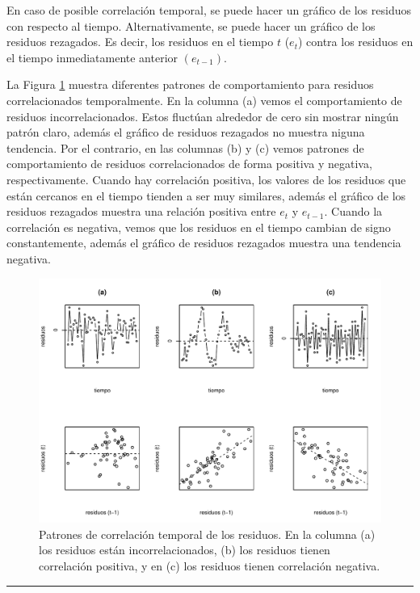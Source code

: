 \documentclass[
]{article}
\begin{document}
En caso de posible correlación temporal, se puede hacer un gráfico de los residuos con respecto al tiempo. Alternativamente, se puede hacer un gráfico de los residuos rezagados. Es decir, los residuos en el tiempo \(t\) (\(e_{t}\)) contra los residuos en el tiempo inmediatamente anterior \((e_{t-1})\).

La Figura \ref{fig:residuosCorr} muestra diferentes patrones de comportamiento para residuos correlacionados temporalmente. En la columna (a) vemos el comportamiento de residuos incorrelacionados. Estos fluctúan alrededor de cero sin mostrar ningún patrón claro, además el gráfico de residuos rezagados no muestra niguna tendencia. Por el contrario, en las columnas (b) y (c) vemos patrones de comportamiento de residuos correlacionados de forma positiva y negativa, respectivamente. Cuando hay correlación positiva, los valores de los residuos que están cercanos en el tiempo tienden a ser muy similares, además el gráfico de los residuos rezagados muestra una relación positiva entre \(e_{t}\) y \(e_{t-1}\). Cuando la correlación es negativa, vemos que los residuos en el tiempo cambian de signo constantemente, además el gráfico de residuos rezagados muestra una tendencia negativa.

\begin{figure}

{\centering \includegraphics{MLGI_files/figure-latex/residuosCorr-1} 

}

\caption{Patrones de correlación temporal de los residuos. En la columna (a) los residuos están incorrelacionados, (b) los residuos tienen correlación positiva, y en (c) los residuos tienen correlación negativa.}\label{fig:residuosCorr}
\end{figure}
\rule{\textwidth}{0.4pt}
\end{document}
